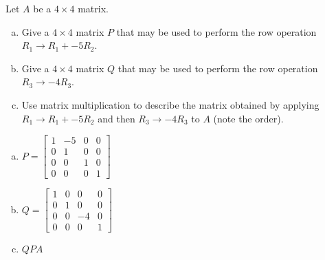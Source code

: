 
\begin{exerciseStatement}


Let \(A\) be a \(4 \times 4\) matrix.


\begin{enumerate}[(a)]
\item Give a \(4 \times 4\) matrix \(P\) that may be used to perform the row operation \( R_1 \to R_1 + -5R_2 \).
\item Give a \(4 \times 4\) matrix \(Q\) that may be used to perform the row operation \( R_3 \to -4R_3 \).
\item Use matrix multiplication to describe the matrix obtained by applying \( R_1 \to R_1 + -5R_2 \) and then \( R_3 \to -4R_3 \) to \(A\) (note the order). 
\end{enumerate}
    
\end{exerciseStatement}
    
\begin{exerciseAnswer} 

\begin{enumerate}[(a)]
\item \(P= \left[\begin{array}{cccc}
1 & -5 & 0 & 0 \\
0 & 1 & 0 & 0 \\
0 & 0 & 1 & 0 \\
0 & 0 & 0 & 1
\end{array}\right] \)
\item \(Q= \left[\begin{array}{cccc}
1 & 0 & 0 & 0 \\
0 & 1 & 0 & 0 \\
0 & 0 & -4 & 0 \\
0 & 0 & 0 & 1
\end{array}\right] \)
\item \(QPA\)
\end{enumerate}
    
\end{exerciseAnswer}
    

